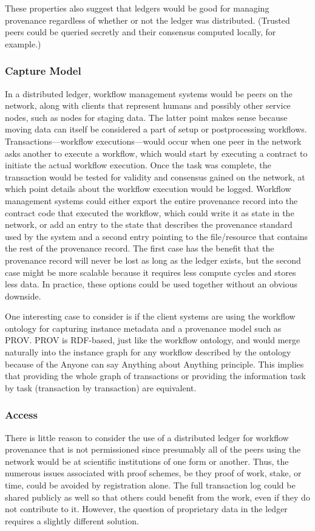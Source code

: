 These properties also suggest that ledgers would be good for managing provenance
regardless of whether or not the ledger was distributed. (Trusted peers could be
queried secretly and their consensus computed locally, for example.)

\subsubsection{Capture Model}
In a distributed ledger, workflow management systems would be peers on the
network, along with clients that represent humans and possibly other service
nodes, such as nodes for staging data. The latter point makes sense because
moving data can itself be considered a part of setup or postprocessing
workflows. Transactions---workflow executions---would occur when one peer in the
network asks another to execute a workflow, which would start by executing a
contract to initiate the actual workflow execution. Once the task was complete,
the transaction would be tested for validity and consensus gained on the
network, at which point details about the workflow execution would be logged.
Workflow management systems could either export the entire provenance record
into the contract code that executed the workflow, which could write it as state
in the network, or add an entry to the state that describes the provenance
standard used by the system and a second entry pointing to the file/resource
that contains the rest of the provenance record. The first case has the benefit
that the provenance record will never be lost as long as the ledger exists, but
the second case might be more scalable because it requires less compute cycles
and stores less data. In practice, these options could be used together without
an obvious downside.

One interesting case to consider is if the client systems are using the workflow
ontology for capturing instance metadata and a provenance model such as PROV.
PROV is RDF-based, just like the workflow ontology, and would merge naturally
into the instance graph for any workflow described by the ontology because of
the Anyone can say Anything about Anything principle. This implies that
providing the whole graph of transactions or providing the information task by
task (transaction by transaction) are equivalent.

\subsubsection{Access}
There is little reason to consider the use of a distributed ledger for workflow
provenance that is not permissioned since presumably all of the peers using the
network would be at scientific institutions of one form or another. Thus, the
numerous issues associated with proof schemes, be they proof of work, stake, or
time, could be avoided by registration alone. The full transaction log could be
shared publicly as well so that others could benefit from the work, even if they
do not contribute to it. However, the question of proprietary data in the ledger
requires a slightly different solution.

